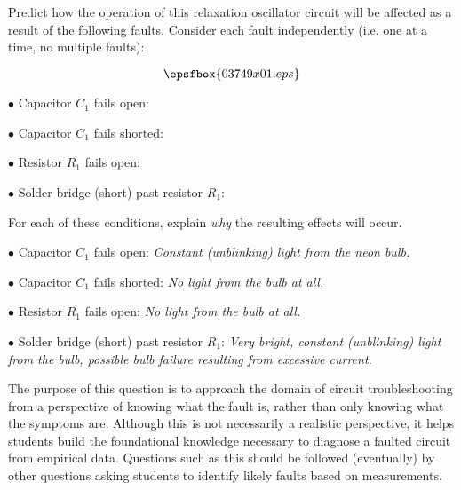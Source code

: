 

Predict how the operation of this relaxation oscillator circuit will be affected as a result of the following faults.  Consider each fault independently (i.e. one at a time, no multiple faults):

$$\epsfbox{03749x01.eps}$$

\medskip
\item{$\bullet$} Capacitor $C_1$ fails open:
\vskip 5pt
\item{$\bullet$} Capacitor $C_1$ fails shorted:
\vskip 5pt
\item{$\bullet$} Resistor $R_1$ fails open:
\vskip 5pt
\item{$\bullet$} Solder bridge (short) past resistor $R_1$:
\medskip

For each of these conditions, explain {\it why} the resulting effects will occur.







\medskip
\item{$\bullet$} Capacitor $C_1$ fails open: {\it Constant (unblinking) light from the neon bulb.}
\vskip 5pt
\item{$\bullet$} Capacitor $C_1$ fails shorted: {\it No light from the bulb at all.}
\vskip 5pt
\item{$\bullet$} Resistor $R_1$ fails open: {\it No light from the bulb at all.}
\vskip 5pt
\item{$\bullet$} Solder bridge (short) past resistor $R_1$: {\it Very bright, constant (unblinking) light from the bulb, possible bulb failure resulting from excessive current.}
\medskip







The purpose of this question is to approach the domain of circuit troubleshooting from a perspective of knowing what the fault is, rather than only knowing what the symptoms are.  Although this is not necessarily a realistic perspective, it helps students build the foundational knowledge necessary to diagnose a faulted circuit from empirical data.  Questions such as this should be followed (eventually) by other questions asking students to identify likely faults based on measurements.





